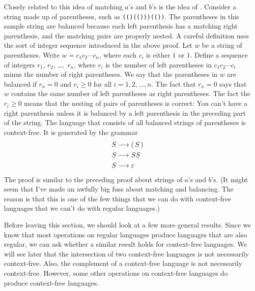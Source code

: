 Closely related to this idea of matching $a$'s and $b$'s is
the idea of .  Consider a string
made up of parentheses, such as \texttt{(()(()))(())}.
The parentheses in this sample string are balanced because
each left parenthesis has a matching right parenthesis,
and the matching pairs are properly nested.  A careful definition
uses the sort of integer sequence introduced in the above
proof.  Let $w$ be a string of parentheses.  Write
$w=c_1c_2\cdots c_n$, where each $c_i$ is either \texttt{(}
or \texttt{)}.  Define a sequence of integers $r_1$, $r_2$, \dots,~$r_n$,
where $r_i$ is the number of left parentheses in $c_1c_2\cdots c_i$
minus the number of right parentheses.  We say that the parentheses
in $w$ are balanced if $r_n=0$ and $r_i\ge0$ for all $i=1,2,\dots,n$.
The fact that $r_n=0$ says that $w$ contains the same number of
left parentheses as right parentheses.  The fact the $r_i\ge0$
means that the nesting of pairs of parentheses is correct:
You can't have a right parenthesis unless it is balanced by a left
parenthesis in the preceding part of the string.  The language
that consists of all balanced strings of parentheses is context-free.  
It is generated by the grammar
\begin{align*}
   S&\longrightarrow (\,S\,)\\
   S&\longrightarrow SS\\
   S&\longrightarrow \varepsilon
\end{align*}
The proof is similar to the preceding proof about strings of
$a$'s and $b$'s.  (It might seem that I've made an awfully big
fuss about matching and balancing.  The reason is that this
is one of the few things that we can do with context-free languages
that we can't do with regular languages.)

\medbreak

Before leaving this section, we should look at a few more
general results.  Since we know that most operations on regular
languages produce languages that are also regular, we can
ask whether a similar result holds for context-free languages.
We will see later that the intersection of two context-free
languages is not necessarily context-free.  Also, the
complement of a context-free language is not necessarily
context-free.  However, some other operations on context-free
languages do produce context-free languages.

